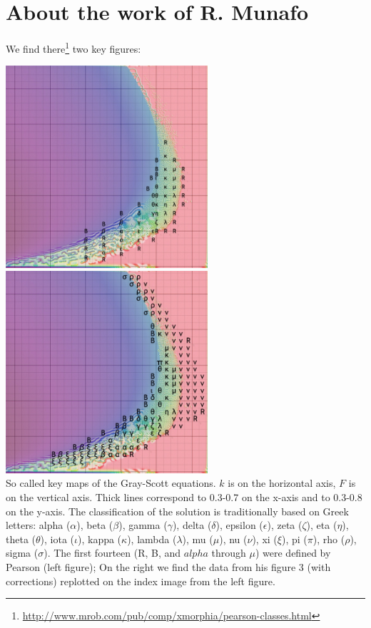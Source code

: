 \section*{About the work of R. Munafo}

We find there\footnote{\url{http://www.mrob.com/pub/comp/xmorphia/pearson-classes.html}}
two key figures:

\begin{center}
\includegraphics[height=7.5cm]{python_codes/fieldstone_171/images/pearson-orig}
\includegraphics[height=7.5cm]{python_codes/fieldstone_171/images/pearson-tags}\\
{\captionfont So called key maps of the Gray-Scott equations. $k$ is on the 
horizontal axis, $F$ is on the vertical axis. Thick lines correspond to 
0.3-0.7 on the x-axis and to 0.3-0.8 on the y-axis.
The classification of the solution is traditionally based on Greek letters:
alpha ($\alpha$),    beta ($\beta$),    gamma ($\gamma$),    delta ($\delta$),    
epsilon ($\epsilon$),    zeta ($\zeta$),    eta ($\eta$),    
theta ($\theta$),    iota ($\iota$),    kappa ($\kappa$),    lambda ($\lambda$),    
mu ($\mu$),    nu ($\nu$),    xi ($\xi$),    pi ($\pi$),    rho ($\rho$),    sigma ($\sigma$).
The first fourteen
(R, B, and $alpha$ through $\mu$) were defined by Pearson \cite{pear93} (left figure); 
On the right we find the data from his figure 3 (with corrections) replotted on the index image from the left figure. 
}
\end{center}

